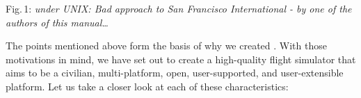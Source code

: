  \centerline{}

\smallskip
 \noindent
Fig.\,1: \textit{\FlightGear{} under UNIX: Bad approach to San Francisco International - by one of the authors of this manual\ldots}
\medskip

The points mentioned above form the basis of why we created \FlightGear{}.
With those motivations in mind, we have set out to create a high-quality
flight simulator that aims to be a civilian,
multi-platform, open,
user-supported, and user-extensible platform.  Let us take a closer look at each of these
characteristics:

